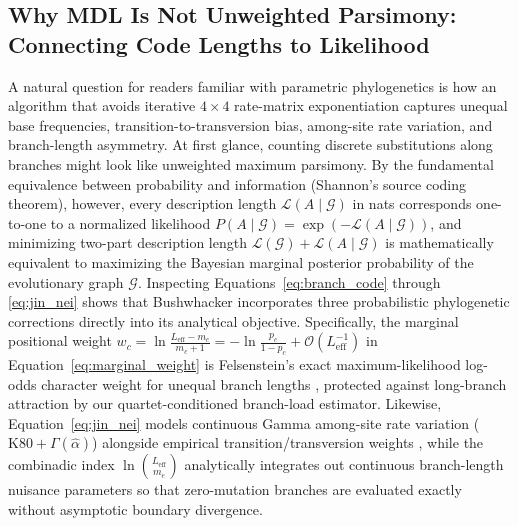 \documentclass[11pt,a4paper]{article}
\begin{document}
\subsection{Why MDL Is Not Unweighted Parsimony: Connecting Code Lengths to Likelihood}

A natural question for readers familiar with parametric phylogenetics is how an algorithm that avoids iterative $4 \times 4$ rate-matrix exponentiation captures unequal base frequencies, transition-to-transversion bias, among-site rate variation, and branch-length asymmetry. At first glance, counting discrete substitutions along branches might look like unweighted maximum parsimony. By the fundamental equivalence between probability and information (Shannon's source coding theorem), however, every description length $\mathcal{L}(A \mid \mathcal{G})$ in nats corresponds one-to-one to a normalized likelihood $P(A \mid \mathcal{G}) = \exp(-\mathcal{L}(A \mid \mathcal{G}))$, and minimizing two-part description length $\mathcal{L}(\mathcal{G}) + \mathcal{L}(A \mid \mathcal{G})$ is mathematically equivalent to maximizing the Bayesian marginal posterior probability of the evolutionary graph $\mathcal{G}$. Inspecting Equations~\eqref{eq:branch_code} through \eqref{eq:jin_nei} shows that Bushwhacker incorporates three probabilistic phylogenetic corrections directly into its analytical objective. Specifically, the marginal positional weight $w_c = \ln\frac{L_{\text{eff}} - m_c}{m_c + 1} = -\ln\frac{p_c}{1 - p_c} + \mathcal{O}(L_{\text{eff}}^{-1})$ in Equation~\eqref{eq:marginal_weight} is Felsenstein's exact maximum-likelihood log-odds character weight for unequal branch lengths \citep{felsenstein1981evolutionary}, protected against long-branch attraction by our quartet-conditioned branch-load estimator. Likewise, Equation~\eqref{eq:jin_nei} models continuous Gamma among-site rate variation ($\text{K80}+\Gamma(\hat{\alpha})$) alongside empirical transition/transversion weights \citep{jin1990limitations}, while the combinadic index $\ln\binom{L_{\text{eff}}}{m_e}$ analytically integrates out continuous branch-length nuisance parameters so that zero-mutation branches are evaluated exactly without asymptotic boundary divergence.
\end{document}
